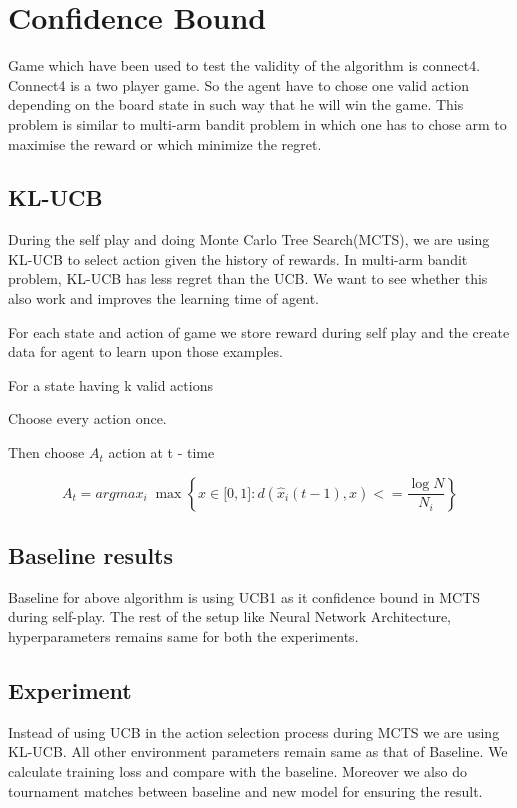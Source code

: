 \chapter{Confidence Bound}
Game which have been used to test the validity of the algorithm is connect4. Connect4 is a two player game. 
So the agent have to chose one valid action depending on the board state in such way that he will win the game. This problem is similar to multi-arm bandit problem in which one has to chose arm to maximise the reward or which minimize the regret.

\section{KL-UCB}
During the self play and doing Monte Carlo Tree Search(MCTS), we are using KL-UCB to select action given the history of rewards. In multi-arm bandit problem, KL-UCB has less regret than the UCB. We want to see whether this also work and improves the learning time of agent.

For each state and action of game we store reward during self play and the create data for agent to learn upon those examples.
 \begin{steps}
  \item For a state having k valid actions
  \item Choose every action once.
  \item Then choose $A_{t}$ action at t - time
	   
$$ A_{t} = argmax_{i}\; \max \left \lbrace x  \in \lbrack 0,1 \rbrack  : d(\hat{x}_{i}(t-1), x) <=  \dfrac{\log N}{N_{i}} \right \rbrace  $$



\end{steps}

\section{Baseline results}
Baseline for above algorithm is using UCB1 as it confidence bound in MCTS during self-play. The rest of the setup like Neural Network Architecture, hyperparameters remains same for both the experiments.

\section{Experiment}
Instead of using UCB in the action selection process during MCTS we are using KL-UCB. All other environment parameters remain same as that of Baseline. We calculate training loss and compare with the baseline. Moreover we also do tournament matches between baseline and new model for ensuring the result.

